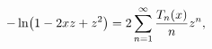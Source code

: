 \[-\mathop{\ln\/}\nolimits\!\left(1-2xz+z^{2}\right)=2\sum_{n=1}^{\infty}\frac{%
\mathop{T_{n}\/}\nolimits\!\left(x\right)}{n}z^{n},\]